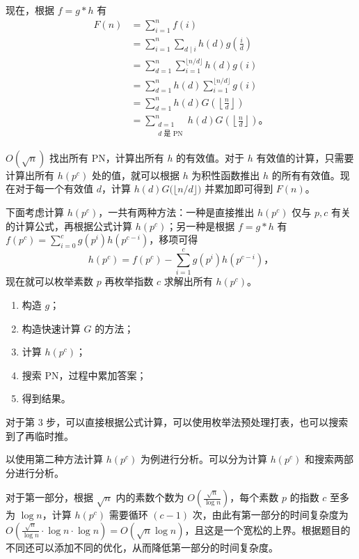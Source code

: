 现在，根据 $f = g * h$ 有
\[
\begin{aligned}
F(n) &= \sum_{i = 1}^{n} f(i) \\
     &= \sum_{i = 1}^{n} \sum_{d\mid i} h(d) g\!\left(\frac{i}{d}\right) \\
     &= \sum_{d=1}^{n} \sum_{i=1}^{\lfloor n/d \rfloor} h(d) g(i) \\
     &= \sum_{d=1}^{n} h(d) \sum_{i=1}^{\lfloor n/d \rfloor} g(i) \\
     &= \sum_{d=1}^{n} h(d) G\!\left(\left\lfloor \frac{n}{d} \right\rfloor\right) \\
     &= \sum_{\substack{d=1 \\ d \text{ 是 PN}}}^{n} h(d) G\!\left(\left\lfloor \frac{n}{d} \right\rfloor\right)。
\end{aligned}
\]

$O(\sqrt{n})$ 找出所有 PN，计算出所有 $h$ 的有效值。对于 $h$ 有效值的计算，只需要计算出所有 $h(p^c)$ 处的值，就可以根据 $h$ 为积性函数推出 $h$ 的所有有效值。现在对于每一个有效值 $d$，计算 $h(d) G\bigl(\lfloor n/d \rfloor\bigr)$ 并累加即可得到 $F(n)$。

下面考虑计算 $h(p^c)$，一共有两种方法：一种是直接推出 $h(p^c)$ 仅与 $p, c$ 有关的计算公式，再根据公式计算 $h(p^c)$；另一种是根据 $f = g * h$ 有 $f(p^c) = \sum_{i=0}^{c} g(p^i) h(p^{c-i})$，移项可得
\[
h(p^c) = f(p^c) - \sum_{i=1}^{c} g(p^i) h(p^{c-i})，
\]
现在就可以枚举素数 $p$ 再枚举指数 $c$ 求解出所有 $h(p^c)$。

\begin{enumerate}
    \item 构造 $g$；
    \item 构造快速计算 $G$ 的方法；
    \item 计算 $h(p^c)$；
    \item 搜索 PN，过程中累加答案；
    \item 得到结果。
\end{enumerate}
对于第 3 步，可以直接根据公式计算，可以使用枚举法预处理打表，也可以搜索到了再临时推。

以使用第二种方法计算 $h(p^c)$ 为例进行分析。可以分为计算 $h(p^c)$ 和搜索两部分进行分析。

对于第一部分，根据 $\sqrt{n}$ 内的素数个数为 $O\!\left(\frac{\sqrt{n}}{\log n}\right)$，每个素数 $p$ 的指数 $c$ 至多为 $\log n$，计算 $h(p^c)$ 需要循环 $(c-1)$ 次，由此有第一部分的时间复杂度为 $O\!\left(\frac{\sqrt{n}}{\log n} \cdot \log n \cdot \log n\right) = O(\sqrt{n}\log n)$，且这是一个宽松的上界。根据题目的不同还可以添加不同的优化，从而降低第一部分的时间复杂度。

